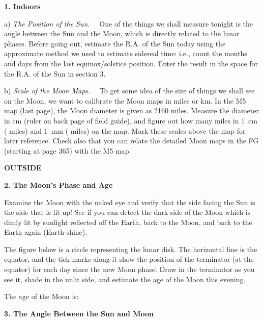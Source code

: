 
\bigskip
\noindent
{\bf 1. Indoors  }

\medskip\noindent 
a) \emph{The Position of the Sun.} \ \ 
One of the things we shall measure tonight is the angle between the Sun
and the Moon, which is directly related to the lunar phases. Before going
out, estimate the R.A. of the Sun today using the approximate
method we used to estimate sidereal time: i.e., count the months and
days from the last equinox/solstice position. Enter the result in the
space for the R.A. of the Sun in section 3.

\medskip\noindent 
b) \emph{Scale of the Moon Maps.} \ \
To get some idea of the size of things we shall see on the Moon, we want to
calibrate the Moon maps in miles or km. In the M5 map (last page), the
Moon diameter is given as 2160 miles. Measure the diameter in cm (ruler
on back page of field guide), and figure out how many miles in 1~cm
(\makebox[1.5cm]{\hrulefill} miles) and 1~mm (\makebox[1.5
cm]{\hrulefill} miles) on the map. Mark these scales above the map for
later reference. Check also that you can relate the detailed Moon maps
in the FG (starting at page 365) with the M5 map.



\bigskip
\noindent
{\bf OUTSIDE}

\bigskip
\noindent
{\bf 2. The Moon's Phase and Age}

\medskip\noindent 
Examine the Moon with the naked eye and verify that the side facing
the Sun is the side that is lit up! 
See if you can detect the dark side of the Moon
which is dimly lit by sunlight reflected off the Earth, back to the
Moon, and back to the Earth again (Earth-shine).

The figure below is a circle representing the lunar disk. The
horizontal line is the equator, and the tick marks along it show the
position of the terminator (at the equator) for each day since the new
Moon phase. Draw in the terminator as you see it, shade in the unlit
side, and estimate the age of the Moon this evening.
\medskip

{ \hfill The age of the Moon is: \makebox[2cm]{\hrulefill} }

\begin{figure*}[h]
        \centerline{}
        \caption{}
         \end{figure*}

\newpage

\bigskip
\noindent
{\bf 3. The Angle Between the Sun and Moon}

